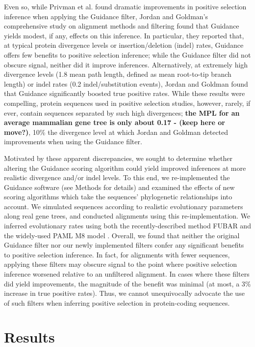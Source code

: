 \documentclass[10pt]{article}
\begin{document}
Even so, while Privman et al. \citep{Privman2012} found dramatic improvements in positive selection inference when applying the Guidance filter, Jordan and Goldman's \citep{Jordan2011} comprehensive study on alignment methods and filtering found that Guidance yields modest, if any, effects on this inference. In particular, they reported that, at typical protein divergence levels or insertion/deletion (indel) rates, Guidance offers few benefits to positive selection inference; while the Guidance filter did not obscure signal, neither did it improve inferences. Alternatively, at extremely high divergence levels (1.8 mean path length, defined as mean root-to-tip branch length) or indel rates (0.2 indel/substitution events), Jordan and Goldman found that Guidance significantly boosted true positive rates. While these results were compelling, protein sequences used in positive selection studies, however, rarely, if ever, contain sequences separated by such high divergences; \textbf{the MPL for an average mammalian gene tree is only about 0.17 \citep{Spielman2013} - (keep here or move?)}, 10\% the divergence level at which Jordan and Goldman detected improvements when using the Guidance filter.

Motivated by these apparent discrepancies, we sought to determine whether altering the Guidance scoring algorithm could yield improved inferences at more realistic divergence and/or indel levels. To this end, we re-implemented the Guidance software (see Methods for details) and examined the effects of new scoring algorithms which take the sequences' phylogenetic relationships into account. We simulated sequences according to realistic evolutionary parameters along real gene trees, and conducted alignments using this re-implementation. We inferred evolutionary rates using both the recently-described method FUBAR \citep{Murrell2013} and the widely-used PAML M8 model \citep{Yang2007}. Overall, we found that neither the original Guidance filter nor our newly implemented filters confer any significant benefits to positive selection inference. In fact, for alignments with fewer sequences, applying these filters may obscure signal to the point where positive selection inference worsened relative to an unfiltered alignment. In cases where these filters did yield improvements, the magnitude of the benefit was minimal (at most, a 3\% increase in true positive rates). Thus, we cannot unequivocally advocate the use of such filters when inferring positive selection in protein-coding sequences.


\section*{Results}
\end{document}
